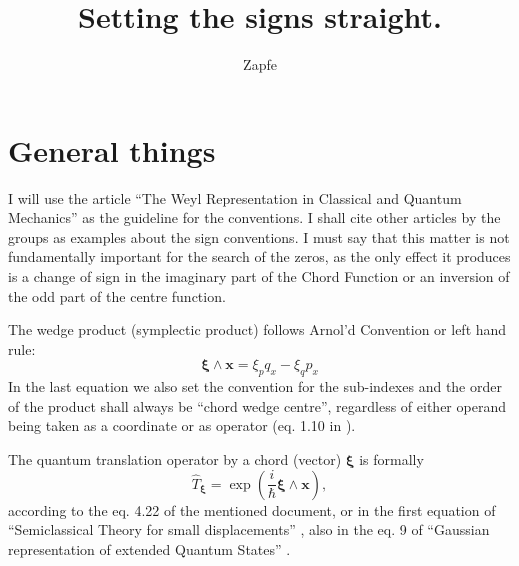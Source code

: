 \documentclass[a4paper,12pt]{article}
\title{Setting the signs straight. }
\author{Zapfe}
\newcommand{\ihb}{\frac{i}{\hbar}}
\newcommand{\xfase}{\mathbf{x}}
\newcommand{\xifase}{ {\boldsymbol{\xi}} }
\begin{document}
\maketitle

\section{General things}

I will use the article ``The Weyl Representation in Classical and Quantum
Mechanics'' \cite{Ozorio98} as the guideline for the conventions. I shall cite other
articles by the groups as examples about the sign conventions. 
I must say that this matter is not fundamentally important for the
search of the zeros, as the only effect it produces is a change of
sign in the imaginary part of the Chord Function or an inversion
of the odd part of the centre function. 

The wedge product (symplectic product) follows Arnol'd Convention or left
hand rule:
\begin{equation}\label{wedgeleft}
\xifase\wedge\xfase=\xi_p q_x - \xi_q p_x
\end{equation}
In the last equation we also set the convention for the
sub-indexes and the order of the product shall always be 
``chord wedge centre'', regardless of either operand
being taken as a coordinate or as operator (eq. 1.10 in \cite{Ozorio98}).

The quantum translation operator by a chord (vector) $\xifase$ is 
formally
\begin{equation}\label{transdef}
\hat{T}_\xifase=\exp (\ihb \xifase\wedge\xfase),
\end{equation}
according to the eq. 4.22 of the mentioned document, or in
the first equation of ``Semiclassical Theory for small displacements''
\cite{Zambrano10}, also in the eq. 9 of ``Gaussian representation of 
extended Quantum States'' \cite{Ozorio11}.
\end{document}
